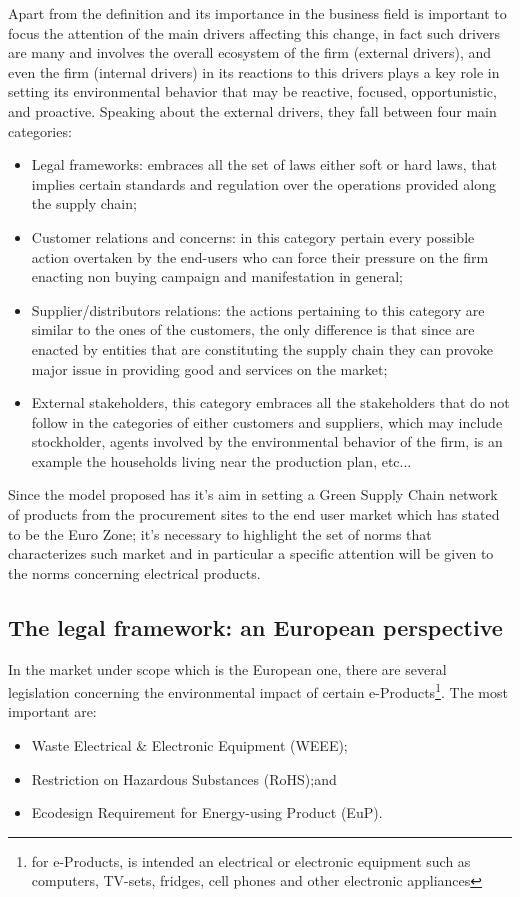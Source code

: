 \documentclass{article}
\begin{document}
  Apart from the definition and its importance in the business field is important to focus the attention of the main drivers affecting this change, in fact such drivers are many and involves the overall ecosystem of the firm (external drivers), and even the firm (internal drivers) in its reactions to this drivers plays a key role in setting its environmental behavior that may be reactive, focused, opportunistic, and proactive\cite{YolLee2007}. Speaking about the external drivers, they fall between four main categories:
  \begin{itemize}
	  \item Legal frameworks: embraces all the set of laws either soft or hard laws, that implies certain standards and regulation over the operations provided along the supply chain;
	  \item Customer relations and concerns: in this category pertain every possible action overtaken by the end-users who can force their pressure on the firm enacting non buying campaign and manifestation in general;
	  \item Supplier/distributors relations: the actions pertaining to this category are similar to the ones of the customers, the only difference is that since are enacted    by entities that are constituting the supply chain they can provoke major issue in providing good and services on the market;
	  \item External stakeholders, this category embraces all the stakeholders that do not follow in the categories of either customers and suppliers, which may include stockholder, agents involved by the environmental behavior of the firm, is an example the households living near the production plan, etc...
  \end{itemize}
Since the model proposed has it's aim in setting a Green Supply Chain network of products from the procurement sites to the end user market which has stated to be the Euro Zone; it's necessary to highlight the set of norms that characterizes such market and in particular a specific attention will be given to the norms concerning electrical products.

  \subsection{The legal framework: an European perspective}
  In the market under scope which is the European one, there are several legislation concerning the environmental impact of certain e-Products\footnote{for e-Products, is intended an electrical or electronic equipment such as computers, TV-sets, fridges, cell phones and other electronic appliances}. The most important are:
  \begin{itemize}
    \item Waste Electrical \& Electronic Equipment (WEEE);
    \item Restriction on Hazardous Substances (RoHS);and
    \item Ecodesign Requirement for Energy-using Product (EuP).
  \end{itemize}
\end{document}

